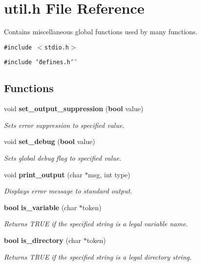 \section{util.h File Reference}
\label{util_8h}
Contains miscellaneous global functions used by many functions.  


{\tt \#include $<$stdio.h$>$}\par
{\tt \#include \char`\"{}defines.h\char`\"{}}\par
\subsection*{Functions}
\begin{CompactItemize}
\item 
void {\bf set\_\-output\_\-suppression} ({\bf bool} value)
\begin{CompactList}\small\item\em Sets error suppression to specified value. \item\end{CompactList}\item 
void {\bf set\_\-debug} ({\bf bool} value)
\begin{CompactList}\small\item\em Sets global debug flag to specified value. \item\end{CompactList}\item 
void {\bf print\_\-output} (char $\ast$msg, int type)
\begin{CompactList}\small\item\em Displays error message to standard output. \item\end{CompactList}\item 
{\bf bool} {\bf is\_\-variable} (char $\ast$token)
\begin{CompactList}\small\item\em Returns TRUE if the specified string is a legal variable name. \item\end{CompactList}\item 
{\bf bool} {\bf is\_\-directory} (char $\ast$token)
\begin{CompactList}\small\item\em Returns TRUE if the specified string is a legal directory string. \item\end{CompactList}\item 

\end{CompactItemize}
